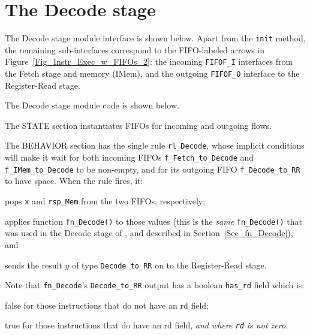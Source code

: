
\section{The Decode stage}

\label{Sec_Fife_Decode_stage}

The Decode stage module interface is shown below.  Apart from the
\verb|init| method, the remaining sub-interfaces correspond to the
FIFO-labeled arrows in Figure~\ref{Fig_Instr_Exec_w_FIFOs_2}: the
incoming \verb|FIFOF_I| interfaces from the Fetch stage and memory
(IMem), and the outgoing \verb|FIFOF_O| interface to the Register-Read
stage.


The Decode stage module code is shown below.


The STATE section instantiates FIFOs for incoming and outgoing flows.

The BEHAVIOR section has the single rule \verb|rl_Decode|, whose
implicit conditions will make it wait for both incoming FIFOs
\verb|f_Fetch_to_Decode| and \verb|f_IMem_to_Decode| to be non-empty,
and for its outgoing FIFO \verb|f_Decode_to_RR| to have space.  When
the rule fires, it:

\begin{tightlist}
 \item pops \verb|x| and \verb|rsp_Mem| from the two FIFOs, respectively;

 \item applies function \verb|fn_Decode()| to those values (this is
       the \emph{same} \verb|fn_Decode()| that was used in the Decode
       stage of {\DRUM}, and described in Section~\ref{Sec_fn_Decode}),
       and

 \item sends the result $y$ of type \verb|Decode_to_RR| on to the
       Register-Read stage.
\end{tightlist}

Note that \verb|fn_Decode|'s \verb|Decode_to_RR| output has a boolean
\verb|has_rd| field which is:

\begin{tightlist}
 \item false for those instructions that do not have an rd field;

 \item true for those instructions that do have an rd field, \emph{and
       where {\tt rd} is not zero}.
\end{tightlist}


